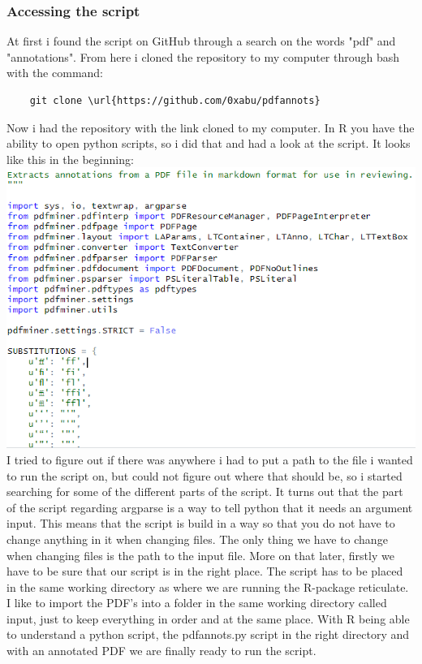 \documentclass{article}
\begin{document}
\subsubsection{Accessing the script}
At first i found the script on GitHub through a search on the words "pdf" and "annotations". From here i cloned the repository to my computer through bash with the command:
\begin{verbatim}
    git clone \url{https://github.com/0xabu/pdfannots}
\end{verbatim}
Now i had the repository with the link cloned to my computer. In R you have the ability to open python scripts, so i did that and had a look at the script. It looks like this in the beginning: \newline
\includegraphics[scale=0.85]{part_of_pdfannotspy.PNG} \newline
I tried to figure out if there was anywhere i had to put a path to the file i wanted to run the script on, but could not figure out where that should be, so i started searching for some of the different parts of the script. It turns out that the part of the script regarding argparse is a way to tell python that it needs an argument input. This means that the script is build in a way so that you do not have to change anything in it when changing files. The only thing we have to change when changing files is the path to the input file. More on that later, firstly we have to be sure that our script is in the right place. The script has to be placed in the same working directory as where we are running the R-package reticulate. I like to import the PDF's into a folder in the same working directory called input, just to keep everything in order and at the same place. \newline
With R being able to understand a python script, the pdfannots.py script in the right directory and with an annotated PDF we are finally ready to run the script.
\end{document}
